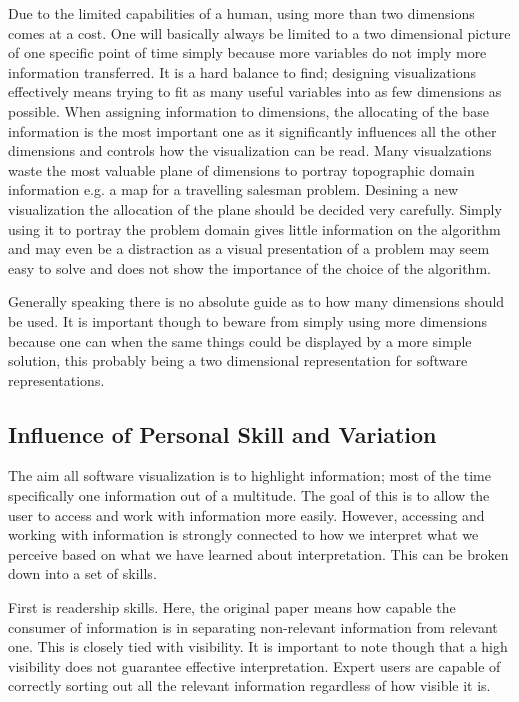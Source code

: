 \documentclass[11pt, a4paper, ngerman, twoside]{article}
\theoremstyle{plain}\newtheorem{Lemma}{Lemma}
\theoremstyle{plain}\newtheorem{Satz}[Lemma]{Satz}
\theoremstyle{definition}\newtheorem{Definition}[Lemma]{Definition}
\theoremstyle{definition}\newtheorem*{Beispiel}{Beispiel}
\theoremstyle{remark}\newtheorem*{Bemerkung}{Bemerkung}
\begin{document}
Due to the limited capabilities of a human, using more than two dimensions comes at a cost. One will basically always be limited to a two dimensional picture of one specific point of time simply because more variables do not imply more information transferred. It is a hard balance to find; designing visualizations effectively means trying to fit as many useful variables into as few dimensions as possible. When assigning information to dimensions, the allocating of the base information is the most important one as it significantly influences all the other dimensions and controls how the visualization can be read. Many visualzations waste the most valuable plane of dimensions to portray topographic domain information e.g. a map for a travelling salesman problem. Desining a new visualization the allocation of the plane should be decided very carefully. Simply using it to portray the problem domain gives little information on the algorithm and may even be a distraction as a visual presentation of a problem may seem easy to solve and does not show the importance of the choice of the algorithm\cite{macgregor}.

Generally speaking there is no absolute guide as to how many dimensions should be used. It is important though to beware from simply using more dimensions because one can when the same things could be displayed by a more simple solution, this probably being a two dimensional representation for software representations.

\subsection{Influence of Personal Skill and Variation}

The aim all software visualization is to highlight information; most of the time specifically one information out of a multitude. The goal of this is to allow the user to access and work with information more easily. However, accessing and working with information is strongly connected to how we interpret what we perceive based on what we have learned about interpretation. This can be broken down into a set of skills.

First is readership skills. Here, the original paper means how capable the consumer of information is in separating non-relevant information from relevant one. This is closely tied with visibility. It is important to note though that a high visibility does not guarantee effective interpretation. Expert users are capable of correctly sorting out all the relevant information regardless of how visible it is.
\end{document}

